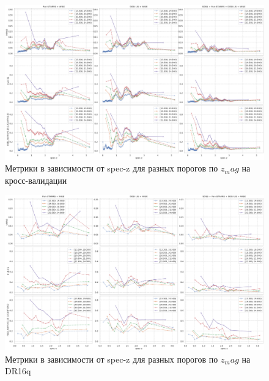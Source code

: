 \documentclass[fleqn,usenatbib]{mnras}
\begin{document}
\begin{landscape}
\begin{figure}
    \centering
    \includegraphics[width=0.9\linewidth]{images/metrics-adv-zspec-x-zmag-cv2.png}
    \caption{Метрики в зависимости от spec-z для разных порогов по $z_mag$ на кросс-валидации}
    \label{fig:my_label}
\end{figure}
\end{landscape}


\begin{landscape}
\begin{figure}
    \centering
    \includegraphics[width=0.9\linewidth]{images/metrics-adv-zspec-x-zmag-dr16q.png}
    \caption{Метрики в зависимости от spec-z для разных порогов по $z_mag$ на DR16q}
    \label{fig:my_label}
\end{figure}
\end{landscape}
\end{document}
